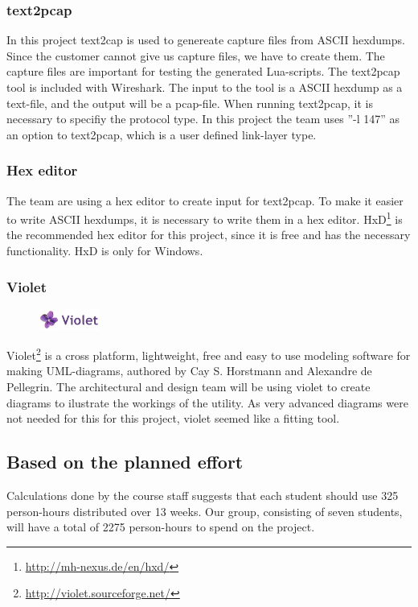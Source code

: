\subsubsection{text2pcap}
In this project text2cap is used to genereate capture files from ASCII
hexdumps. Since the customer cannot give us capture files, we have to create
them. The capture files are important for testing the generated Lua-scripts.
The text2pcap tool is included with Wireshark. The input to the tool is a ASCII
hexdump as a text-file, and the output will be a pcap-file. When running
text2pcap, it is necessary to specifiy the protocol type. In this project the
team uses ''-l 147'' as an option to text2pcap, which is a user defined
link-layer type.

\subsubsection{Hex editor}
The team are using a hex editor to create input for text2pcap. To make it
easier to write ASCII hexdumps, it is necessary to write them in a hex editor.
HxD\footnote{\url{http://mh-nexus.de/en/hxd/}} is the recommended hex editor
for this project, since it is free and has the necessary functionality. HxD is
only for Windows.

\subsubsection{Violet}
\begin{figure}
	\vspace{-20pt}
	\includegraphics[width=2cm]{./planning/img/violet_logo}
	\vspace{-20pt}
\end{figure}
Violet\footnote{\url{http://violet.sourceforge.net/}} is a cross platform,
lightweight, free and easy to use modeling software for making UML-diagrams,
authored by Cay S. Horstmann and Alexandre de Pellegrin. The architectural and
design team will be using violet to create diagrams to ilustrate the workings
of the utility. As very advanced diagrams were not needed for this for this
project, violet seemed like a fitting tool.

\subsection{Based on the planned effort}
Calculations done by the course staff suggests that each student should use 325 person-hours distributed over 13 weeks. Our group, consisting of seven students, will have a total of 2275 person-hours to spend on the project. 


